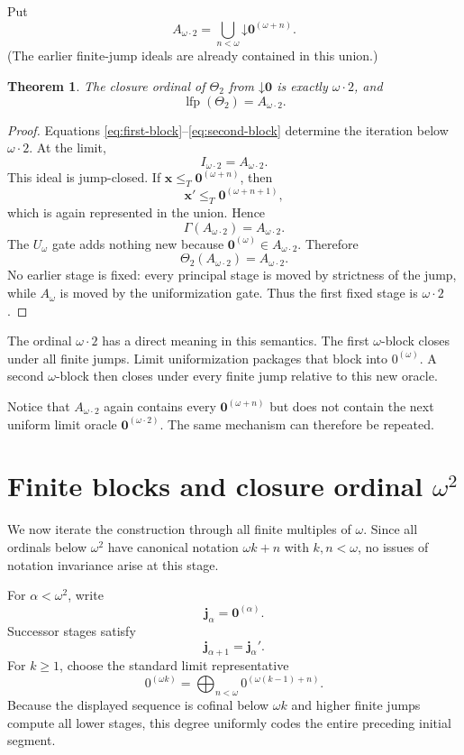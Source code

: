 \documentclass[11pt]{article}
\newtheorem{theorem}{Theorem}[section]
\theoremstyle{definition}
\theoremstyle{remark}
\newcommand{\lfp}{\operatorname{lfp}}
\newcommand{\down}{\mathord{\downarrow}}
\newcommand{\bigjoin}{\bigoplus}
\newcommand{\leT}{\leq_T}
\begin{document}
Put
\begin{equation}
A_{\omega\cdot2}
=
\bigcup_{n<\omega}\down\mathbf0^{(\omega+n)}.
\label{eq:A-omega2}
\end{equation}
(The earlier finite-jump ideals are already contained in this union.)

\begin{theorem}
\label{thm:omega-times-two}
The closure ordinal of $\Theta_2$ from $\down\mathbf0$ is exactly $\omega\cdot2$, and
\[
\lfp(\Theta_2)=A_{\omega\cdot2}.
\]
\end{theorem}

\begin{proof}
Equations \eqref{eq:first-block}--\eqref{eq:second-block} determine the iteration below $\omega\cdot2$. At the limit,
\[
I_{\omega\cdot2}=A_{\omega\cdot2}.
\]
This ideal is jump-closed. If $\mathbf x\leT\mathbf0^{(\omega+n)}$, then
\[
\mathbf x'\leT\mathbf0^{(\omega+n+1)},
\]
which is again represented in the union. Hence
\[
\Gamma(A_{\omega\cdot2})=A_{\omega\cdot2}.
\]
The $U_\omega$ gate adds nothing new because $\mathbf0^{(\omega)}\in A_{\omega\cdot2}$. Therefore
\[
\Theta_2(A_{\omega\cdot2})=A_{\omega\cdot2}.
\]
No earlier stage is fixed: every principal stage is moved by strictness of the jump, while $A_\omega$ is moved by the uniformization gate. Thus the first fixed stage is $\omega\cdot2$.
\end{proof}

The ordinal $\omega\cdot2$ has a direct meaning in this semantics. The first $\omega$-block closes under all finite jumps. Limit uniformization packages that block into $0^{(\omega)}$. A second $\omega$-block then closes under every finite jump relative to this new oracle.

Notice that $A_{\omega\cdot2}$ again contains every $\mathbf0^{(\omega+n)}$ but does not contain the next uniform limit oracle $\mathbf0^{(\omega\cdot2)}$. The same mechanism can therefore be repeated.

\section{Finite blocks and closure ordinal \texorpdfstring{$\omega^2$}{omega squared}}

We now iterate the construction through all finite multiples of $\omega$. Since all ordinals below $\omega^2$ have canonical notation $\omega k+n$ with $k,n<\omega$, no issues of notation invariance arise at this stage.

For $\alpha<\omega^2$, write
\[
\mathbf j_\alpha=\mathbf0^{(\alpha)}.
\]
Successor stages satisfy
\begin{equation}
\mathbf j_{\alpha+1}=\mathbf j_\alpha'.
\label{eq:j-successor}
\end{equation}
For $k\geq1$, choose the standard limit representative
\begin{equation}
0^{(\omega k)}
=
\bigjoin_{n<\omega}0^{(\omega(k-1)+n)}.
\label{eq:block-limit-join}
\end{equation}
Because the displayed sequence is cofinal below $\omega k$ and higher finite jumps compute all lower stages, this degree uniformly codes the entire preceding initial segment.
\end{document}
